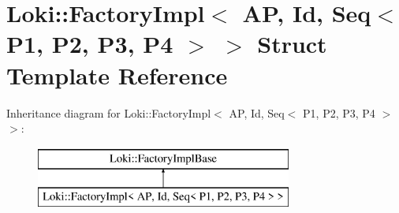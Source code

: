 \hypertarget{structLoki_1_1FactoryImpl_3_01AP_00_01Id_00_01Seq_3_01P1_00_01P2_00_01P3_00_01P4_01_4_01_4}{}\section{Loki\+:\+:Factory\+Impl$<$ A\+P, Id, Seq$<$ P1, P2, P3, P4 $>$ $>$ Struct Template Reference}
\label{structLoki_1_1FactoryImpl_3_01AP_00_01Id_00_01Seq_3_01P1_00_01P2_00_01P3_00_01P4_01_4_01_4}
Inheritance diagram for Loki\+:\+:Factory\+Impl$<$ A\+P, Id, Seq$<$ P1, P2, P3, P4 $>$ $>$\+:\begin{figure}[H]
\begin{center}
\leavevmode
\includegraphics[height=2.000000cm]{structLoki_1_1FactoryImpl_3_01AP_00_01Id_00_01Seq_3_01P1_00_01P2_00_01P3_00_01P4_01_4_01_4}
\end{center}
\end{figure}
